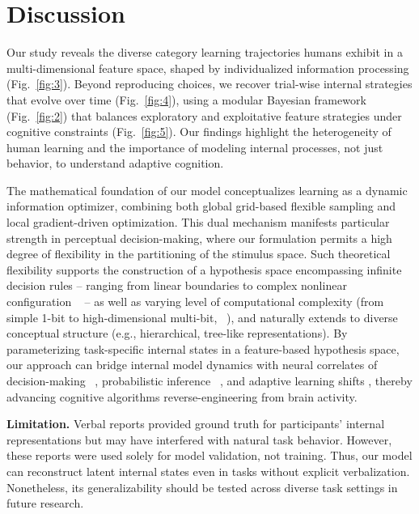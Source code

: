 \section{Discussion}
\label{sec: discussion}

Our study reveals the diverse category learning trajectories humans exhibit in a multi-dimensional feature space, shaped by individualized information processing (Fig.~\ref{fig:3}). Beyond reproducing choices, we recover trial-wise internal strategies that evolve over time (Fig.~\ref{fig:4}), using a modular Bayesian framework (Fig.~\ref{fig:2}) that balances exploratory and exploitative feature strategies under cognitive constraints (Fig.~\ref{fig:5}). Our findings highlight the heterogeneity of human learning and the importance of modeling internal processes, not just behavior, to understand adaptive cognition.

The mathematical foundation of our model conceptualizes learning as a dynamic information optimizer, combining both global grid-based flexible sampling and local gradient-driven optimization. This dual mechanism manifests particular strength in perceptual decision-making, where our formulation permits a high degree of flexibility in the partitioning of the stimulus space. Such theoretical flexibility supports the construction of a hypothesis space encompassing infinite decision rules – ranging from linear boundaries to complex nonlinear configuration ~\cite{jaworska2022different} – as well as varying level of computational complexity (from simple 1-bit to high-dimensional multi-bit, ~\cite{cohen2013high}), and naturally extends to diverse conceptual structure (e.g., hierarchical, tree-like representations). By parameterizing task-specific internal states in a feature-based hypothesis space, our approach can bridge internal model dynamics with neural correlates of decision-making ~\cite{yang2007probabilistic}, probabilistic inference ~\cite{soltani2006neural}, and adaptive learning shifts \cite{nassar2010approximately}, thereby advancing cognitive algorithms reverse-engineering from brain activity.

\textbf{Limitation.} Verbal reports provided ground truth for participants’ internal representations but may have interfered with natural task behavior. However, these reports were used solely for model validation, not training. Thus, our model can reconstruct latent internal states even in tasks without explicit verbalization. Nonetheless, its generalizability should be tested across diverse task settings in future research.
